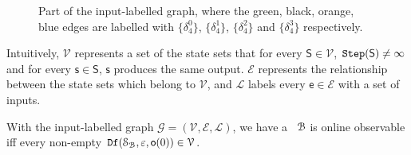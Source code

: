 \begin{figure}[thpb]
      \centering
      \caption{Part of the input-labelled graph, where the green, black, orange, blue edges are labelled with $\{\delta_4^0\}$, $\{\delta_4^1\}$, $\{\delta_4^2\}$ and $\{\delta_4^3\}$ respectively.}
      \label{fig:4}
\end{figure}
Intuitively, $\mathcal{V}$ represents a set of the state sets that for every $\mathsf{S}\in \mathcal{V}$, ${\tt Step}(\mathsf{S})\ne \infty$ and for every $\mathsf{s}\in\mathsf{S}$, $\mathsf{s}$ produces the same output. $\mathcal{E}$ represents the relationship between the state sets which belong to $\mathcal{V}$, and $\mathcal{L}$ labels every $\mathsf{e} \in\mathcal{E}$ with a set of inputs. 

With the input-labelled graph $\mathcal{G}=(\mathcal{V}, \mathcal{E}, \mathcal{L})$, we have a \BCN\ ${\mathcal{B}}$ is online observable iff every non-empty ${\tt Df}(\mathcal{S}_{\mathcal{B}},\varepsilon, \mathsf{o}(0))\in \mathcal{V}$. %


